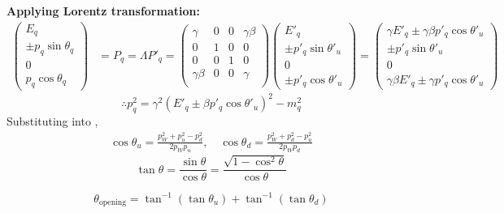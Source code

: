 \documentclass[12pt]{article}
\begin{document}
{\bf Applying Lorentz transformation:}
%
\begin{align}
  \begin{pmatrix}
    E_q \\
    \pm p_q\sin\theta_q \\
    0 \\
    p_q\cos\theta_q
  \end{pmatrix} &=
  P_q = \Lambda P'_q =
  \begin{pmatrix}
    \gamma & 0 & 0 & \gamma\beta \\
    0 & 1 & 0 & 0 \\
    0 & 0 & 1 & 0 \\
    \gamma\beta & 0 & 0 & \gamma \\
  \end{pmatrix}
  \begin{pmatrix}
    E'_q \\
    \pm p'_q\sin\theta'_u \\
    0 \\
    \pm p'_q\cos\theta'_u
  \end{pmatrix}
  =
  \begin{pmatrix}
    \gamma E'_q \pm \gamma\beta p'_q\cos\theta'_u \\
    \pm p'_q\sin\theta'_u \\
    0 \\
    \gamma\beta E'_q \pm \gamma p'_q\cos\theta'_u
  \end{pmatrix}
\end{align}
%
\begin{equation}
  \therefore
  p_q^2 = \gamma^2 (E'_q \pm \beta p'_q\cos\theta'_u)^2 - m_q^2
\end{equation}
%
Substituting into ,
\begin{align}
  \cos\theta_u = \frac{p_W^2 + p_u^2 - p_d^2}{2p_Wp_u}, \quad
  \cos\theta_d = \frac{p_W^2 + p_d^2 - p_u^2}{2p_Wp_d}
\end{align}
%
\begin{equation}
  \tan\theta = \frac{\sin\theta}{\cos\theta}
  = \frac{\sqrt{1-\cos^2\theta}}{\cos\theta}
\end{equation}
%

\begin{equation}\label{eq:result}
  \boxed{
    \theta_\mathrm{opening}
    = \tan^{-1}(\tan\theta_u) + \tan^{-1}(\tan\theta_d)
  }
\end{equation}

\end{document}
